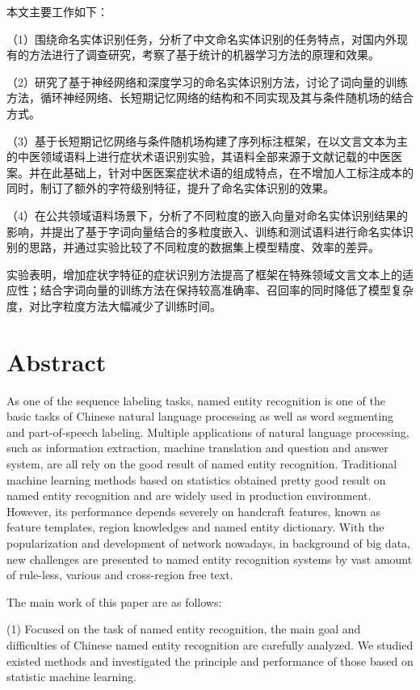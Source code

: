 本文主要工作如下：

（1）围绕命名实体识别任务，分析了中文命名实体识别的任务特点，对国内外现有的方法进行了调查研究，考察了基于统计的机器学习方法的原理和效果。

（2）研究了基于神经网络和深度学习的命名实体识别方法，讨论了词向量的训练方法，循环神经网络、长短期记忆网络的结构和不同实现及其与条件随机场的结合方式。

（3）基于长短期记忆网络与条件随机场构建了序列标注框架，在以文言文本为主的中医领域语料上进行症状术语识别实验，其语料全部来源于文献记载的中医医案。并在此基础上，针对中医医案症状术语的组成特点，在不增加人工标注成本的同时，制订了额外的字符级别特征，提升了命名实体识别的效果。

（4）在公共领域语料场景下，分析了不同粒度的嵌入向量对命名实体识别结果的影响，并提出了基于字词向量结合的多粒度嵌入、训练和测试语料进行命名实体识别的思路，并通过实验比较了不同粒度的数据集上模型精度、效率的差异。

实验表明，增加症状字特征的症状识别方法提高了框架在特殊领域文言文本上的适应性；结合字词向量的训练方法在保持较高准确率、召回率的同时降低了模型复杂度，对比字粒度方法大幅减少了训练时间。\\
\chapter*{Abstract}%
As one of the sequence labeling tasks, named entity recognition is one of the basic tasks of Chinese natural language processing as well as word segmenting and part-of-speech labeling.
Multiple applications of natural language processing, such as information extraction, machine translation and question and answer system, are all rely on the good result of named entity recognition.
Traditional machine learning methods based on statistics obtained pretty good result on named entity recognition and are widely used in production environment.
However, its performance depends severely on handcraft features, known as feature templates, region knowledges and named entity dictionary.
With the popularization and development of network nowadays, in background of big data, new challenges are presented to named entity recognition systems by vast amount of rule-less, various and cross-region free text.

The main work of this paper are as follows:

(1) Focused on the task of named entity recognition, the main goal and difficulties of Chinese named entity recognition are carefully analyzed. We studied existed methods and investigated the principle and performance of those based on statistic machine learning.

